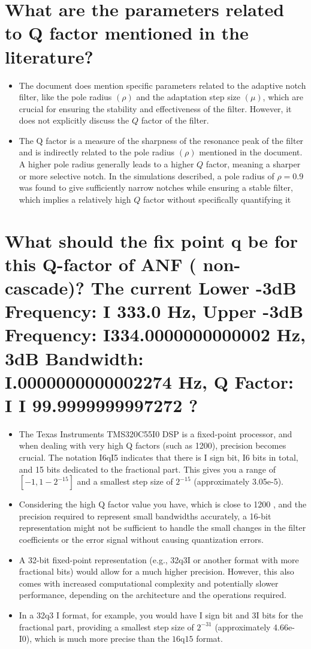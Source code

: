 \section{What are the parameters related to $\mathbf{Q}$ factor mentioned in the literature?}

\begin{itemize}
  \item The document does mention specific parameters related to the adaptive notch filter, like the pole radius $(\rho)$ and the adaptation step size $(\mu)$, which are crucial for ensuring the stability and effectiveness of the filter. However, it does not explicitly discuss the $Q$ factor of the filter.
  \item The $\mathrm{Q}$ factor is a measure of the sharpness of the resonance peak of the filter and is indirectly related to the pole radius $(\rho)$ mentioned in the document. A higher pole radius generally leads to a higher $Q$ factor, meaning a sharper or more selective notch. In the simulations described, a pole radius of $\rho=0.9$ was found to give sufficiently narrow notches while ensuring a stable filter, which implies a relatively high $Q$ factor without specifically quantifying it
\end{itemize}

\section{What should the fix point q be for this Q-factor of ANF ( non-cascade)? The current Lower -3dB
Frequency: I 333.0 Hz, Upper -3dB Frequency: I334.0000000000002 Hz, 3dB Bandwidth:
I.0000000000002274 Hz, Q Factor: I I 99.9999999997272 ?}

\begin{itemize}
  \item The Texas Instruments TMS320C55I0 DSP is a fixed-point processor, and when dealing with very high Q factors (such as 1200), precision becomes crucial. The notation I6qI5 indicates that there is I sign bit, I6 bits in total, and 15 bits dedicated to the fractional part. This gives you a range of $\left[-1,1-2^{-15}\right]$ and a smallest step size of $2^{-15}$ (approximately 3.05e-5).
  \item Considering the high $\mathrm{Q}$ factor value you have, which is close to 1200 , and the precision required to represent small bandwidths accurately, a 16-bit representation might not be sufficient to handle the small changes in the filter coefficients or the error signal without causing quantization errors.
  \item A 32-bit fixed-point representation (e.g., 32q3I or another format with more fractional bits) would allow for a much higher precision. However, this also comes with increased computational complexity and potentially slower performance, depending on the architecture and the operations required.
  \item In a 32q3 I format, for example, you would have I sign bit and 3I bits for the fractional part, providing a smallest step size of $2^{-31}$ (approximately 4.66e-I0), which is much more precise than the $16 \mathrm{q} 15$ format.
\end{itemize}

